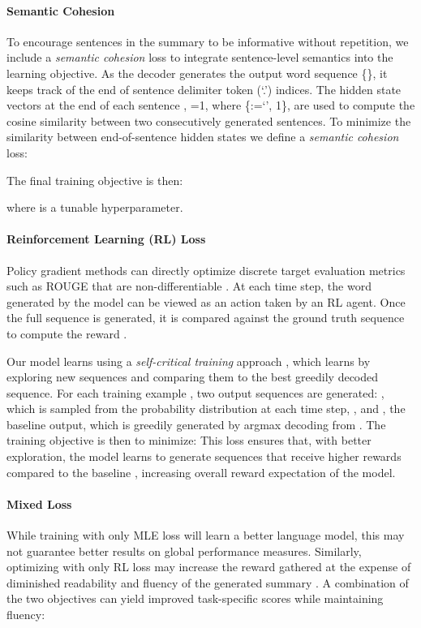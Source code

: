 \documentclass[11pt,a4paper]{article}
\begin{document}
\paragraph{Semantic Cohesion}
To encourage sentences in the summary to be informative without repetition, 
we include a \emph{semantic cohesion} loss to integrate sentence-level semantics into the learning objective. 
As the decoder generates the output word sequence \{\}, it keeps track of the end of sentence delimiter token (`.') indices. 
The hidden state vectors at the end of each sentence , =1, where \{:=`', 1\}, are used to compute the cosine similarity between two consecutively generated sentences. 
To minimize the similarity between end-of-sentence hidden states we define a \emph{semantic cohesion} loss: 

The final training objective is then:
\vspace*{-1mm}

where  is a tunable hyperparameter. 
\paragraph{Reinforcement Learning (RL) Loss}
Policy gradient methods can directly optimize discrete target evaluation metrics such as ROUGE that are non-differentiable \cite{rlsummsocher,seqtutor,scvc,googlemt}. At each time step, the word generated by the model can be viewed as an action taken by an RL agent.
Once the full sequence  is generated, it is compared against the ground truth sequence  to compute the reward . 

Our model learns using a \textit{self-critical training} approach \cite{scic}, which learns by exploring new sequences and comparing them to the best greedily decoded sequence. 
For each training example , two output sequences are generated: , which is sampled from the probability distribution at each time step, , and , the baseline output, which is greedily generated by argmax decoding from . The training objective is then to minimize: 
This loss ensures that, with better exploration, the model learns to generate sequences   that receive higher rewards compared to the baseline , increasing overall reward expectation of the model. 
\paragraph{Mixed Loss} 
While training with only MLE loss will learn a better language model, this may not guarantee better results on global performance measures. Similarly, optimizing with only RL loss may increase the reward gathered at the expense of diminished readability and fluency of the generated summary \cite{rlsummsocher}. A combination of the two objectives can yield improved task-specific scores while maintaining fluency:
\end{document}
